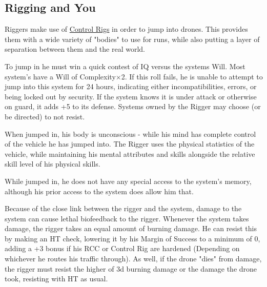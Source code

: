 


\begin{multicols*}{3}
	
	\subsection{Rigging and You}\label{rigger_rules}
	
	Riggers make use of \hyperref[control_rig]{Control Rigs} in order to jump into drones. This provides them with a wide variety of "bodies" to use for runs, while also putting a layer of separation between them and the real world.
	
	To jump in he must win a quick contest of IQ versus the systems Will. Most system's have a Will of Complexity\(\times\)2. If this roll fails, he is unable to attempt to jump into this system for 24 hours, indicating either incompatibilities, errors, or being locked out by security. If the system knows it is under attack or otherwise on guard, it adds +5 to its defense. Systems owned by the Rigger may choose (or be directed) to not resist.
	
	When jumped in, his body is unconscious - while his mind has complete control of the vehicle he has jumped into. The Rigger uses the physical statistics of the vehicle, while maintaining his mental attributes and skills alongside the relative skill level of his physical skills.
	
	While jumped in, he does not have any special access to the system's memory, although his prior access to the system does allow him that.
	
	Because of the close link between the rigger and the system, damage to the system can cause lethal biofeedback to the rigger. Whenever the system takes damage, the rigger takes an equal amount of burning damage. He can resist this by making an HT check, lowering it by his Margin of Success to a minimum of 0, adding a +3 bonus if his RCC or Control Rig are hardened (Depending on whichever he routes his traffic through). As well, if the drone "dies" from damage, the rigger must resist the higher of 3d burning damage or the damage the drone took, resisting with HT as usual. 
	

\end{multicols*}
